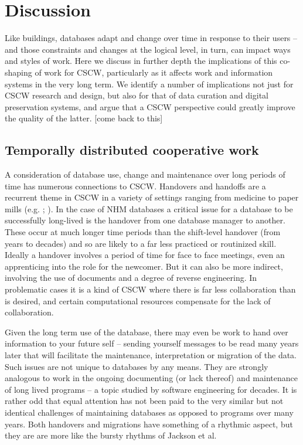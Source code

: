 \section{Discussion}

Like buildings, databases adapt and change over time in response to their users -- and those constraints and changes at the logical level, in turn, can impact ways and styles of work.  Here we discuss in further depth the implications of this co-shaping of work for CSCW, particularly as it affects work and information systems in the very long term. We identify a number of implications not just for CSCW research and design, but also for that of data curation and digital preservation systems, and argue that a CSCW perspective could greatly improve the quality of the latter. [come back to this]

\subsection{Temporally distributed cooperative work}

A consideration of database use, change and maintenance over long periods of time has numerous connections to CSCW. Handovers and handoffs are a recurrent theme in CSCW in a variety of settings ranging from medicine to paper mills (e.g. \cite{sarcevic2009information};  \cite{auramaki1996paperwork}). In the case of NHM databases a critical issue for a database to be successfully long-lived is the handover from one database manager to another. These occur at much longer time periods than the shift-level handover (from years to decades) and so are likely to a far less practiced or routinized skill. Ideally a handover involves a period of time for face to face meetings, even an apprenticing into the role for the newcomer. But it can also be more indirect, involving the use of documents and a degree of reverse engineering. In problematic cases it is a kind of CSCW where there is far less collaboration than is desired, and certain computational resources compensate for the lack of collaboration. 

Given the long term use of the database, there may even be work to hand over information to your future self – sending yourself messages to be read many years later that will facilitate the maintenance, interpretation or migration of the data. Such issues are not unique to databases by any means. They are strongly analogous to work in the ongoing documenting (or lack thereof) and maintenance of long lived programs – a topic studied by software engineering for decades. It is rather odd that equal attention has not been paid to the very similar but not identical challenges of maintaining databases as opposed to programs over many years. Both handovers and migrations have something of a rhythmic aspect, but they are are more like the bursty rhythms of Jackson et al. \cite{jackson2011collaborative}

